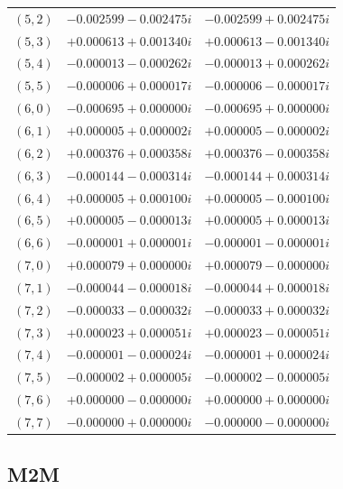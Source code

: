 \documentclass[10pt,dvipsnames,table]{article}
\begin{document}
\begin{table}[H]
\begin{tabular}{@{}ccc@{}}
$(5, 2)$ & $-0.002599 - 0.002475i$ & $-0.002599 + 0.002475i$ \\
$(5, 3)$ & $+0.000613 + 0.001340i$ & $+0.000613 - 0.001340i$ \\ \rowcolor{TableRowAlt}
$(5, 4)$ & $-0.000013 - 0.000262i$ & $-0.000013 + 0.000262i$ \\
$(5, 5)$ & $-0.000006 + 0.000017i$ & $-0.000006 - 0.000017i$ \\ \rowcolor{TableRowAlt}
$(6, 0)$ & $-0.000695 + 0.000000i$ & $-0.000695 + 0.000000i$ \\
$(6, 1)$ & $+0.000005 + 0.000002i$ & $+0.000005 - 0.000002i$ \\ \rowcolor{TableRowAlt}
$(6, 2)$ & $+0.000376 + 0.000358i$ & $+0.000376 - 0.000358i$ \\
$(6, 3)$ & $-0.000144 - 0.000314i$ & $-0.000144 + 0.000314i$ \\ \rowcolor{TableRowAlt}
$(6, 4)$ & $+0.000005 + 0.000100i$ & $+0.000005 - 0.000100i$ \\
$(6, 5)$ & $+0.000005 - 0.000013i$ & $+0.000005 + 0.000013i$ \\ \rowcolor{TableRowAlt}
$(6, 6)$ & $-0.000001 + 0.000001i$ & $-0.000001 - 0.000001i$ \\
$(7, 0)$ & $+0.000079 + 0.000000i$ & $+0.000079 - 0.000000i$ \\ \rowcolor{TableRowAlt}
$(7, 1)$ & $-0.000044 - 0.000018i$ & $-0.000044 + 0.000018i$ \\
$(7, 2)$ & $-0.000033 - 0.000032i$ & $-0.000033 + 0.000032i$ \\ \rowcolor{TableRowAlt}
$(7, 3)$ & $+0.000023 + 0.000051i$ & $+0.000023 - 0.000051i$ \\
$(7, 4)$ & $-0.000001 - 0.000024i$ & $-0.000001 + 0.000024i$ \\ \rowcolor{TableRowAlt}
$(7, 5)$ & $-0.000002 + 0.000005i$ & $-0.000002 - 0.000005i$ \\
$(7, 6)$ & $+0.000000 - 0.000000i$ & $+0.000000 + 0.000000i$ \\ \rowcolor{TableRowAlt}
$(7, 7)$ & $-0.000000 + 0.000000i$ & $-0.000000 - 0.000000i$ \\
\bottomrule
\end{tabular}
\end{table}

\subsection{M2M}
\end{document}
